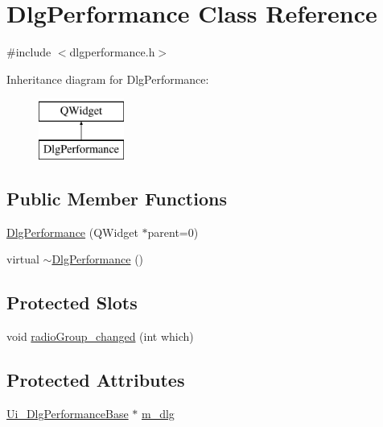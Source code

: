 \hypertarget{classDlgPerformance}{\section{Dlg\+Performance Class Reference}
\label{classDlgPerformance}
}


{\ttfamily \#include $<$dlgperformance.\+h$>$}

Inheritance diagram for Dlg\+Performance\+:\begin{figure}[H]
\begin{center}
\leavevmode
\includegraphics[height=2.000000cm]{classDlgPerformance}
\end{center}
\end{figure}
\subsection*{Public Member Functions}
\begin{DoxyCompactItemize}
\item 
\hyperlink{classDlgPerformance_afe916fa76c0582255b8a57dbbfa02fc8}{Dlg\+Performance} (Q\+Widget $\ast$parent=0)
\item 
virtual \hyperlink{classDlgPerformance_a66990ee66393d50e390103e80f45bf37}{$\sim$\+Dlg\+Performance} ()
\end{DoxyCompactItemize}
\subsection*{Protected Slots}
\begin{DoxyCompactItemize}
\item 
void \hyperlink{classDlgPerformance_aed95f65483f78ef4b3dbdaf110c9b182}{radio\+Group\+\_\+changed} (int which)
\end{DoxyCompactItemize}
\subsection*{Protected Attributes}
\begin{DoxyCompactItemize}
\item 
\hyperlink{classUi__DlgPerformanceBase}{Ui\+\_\+\+Dlg\+Performance\+Base} $\ast$ \hyperlink{classDlgPerformance_a67b6c616fbba78dc1650d5a3f2ed3084}{m\+\_\+dlg}
\end{DoxyCompactItemize}



